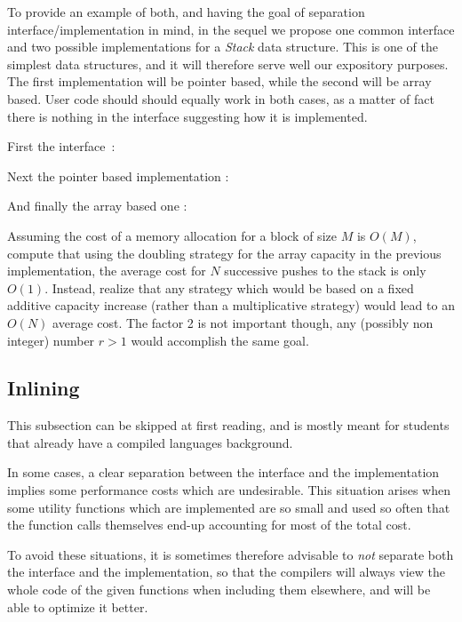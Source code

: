 \documentclass[12pt]{article}
\theoremstyle{plain}
\theoremstyle{remark}
\begin{document}
To provide an example of both, and having the goal of separation 
interface/implementation in mind, in the sequel we propose one common 
interface and two possible implementations for a {\it Stack} data structure.
This is one of the simplest data structures, and it will therefore serve well
our expository purposes. The first implementation will be pointer based, while 
the second will be array based. 
User code should should equally work in both cases, as a matter of fact there
is nothing in the interface suggesting how it is implemented.

\medskip
\noindent
First the interface~:


\noindent
Next the pointer based implementation :


\noindent
And finally the array based one :


 Assuming the cost of a memory allocation for a block
of size $M$ is $O(M)$, compute that using the doubling strategy for the array
capacity in the previous implementation, the average cost for $N$ successive
pushes to the stack is only $O(1)$. Instead, realize that any strategy which
would be based on a fixed additive capacity increase (rather than a 
multiplicative strategy) would lead to an $O(N)$ average cost. The factor 2 is
not important though, any (possibly non integer) number $r>1$ would accomplish
the same goal.  

\subsection{Inlining}

This subsection can be skipped at first reading, and is mostly meant for students 
that already have a compiled languages background.

In some cases, a clear separation between the interface and the implementation 
implies some performance costs which are undesirable. This situation arises
when some utility functions which are implemented are so small and used so often 
that the function calls themselves end-up accounting for most of the total cost.

\medskip

To avoid these situations, it is sometimes therefore advisable to {\it not}
separate both the interface and the implementation, so that the compilers will
always view the whole code of the given functions when including them elsewhere,
and will be able to optimize it better.
\end{document}
